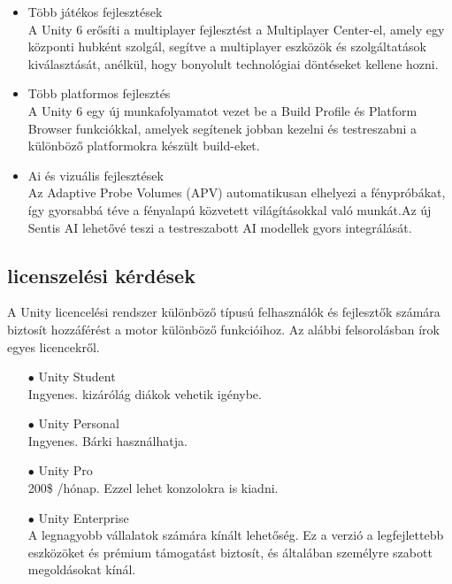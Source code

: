 \documentclass[
]{thesis-ekf}
\theoremstyle{definition}
\theoremstyle{remark}
\begin{document}
\begin{itemize}
\begin{itemize}
		\item Több játékos fejlesztések \\A  Unity 6 erősíti a multiplayer fejlesztést a Multiplayer Center-el, amely egy központi hubként szolgál, segítve a multiplayer eszközök és szolgáltatások kiválasztását, anélkül, hogy bonyolult technológiai döntéseket kellene hozni.
		\item Több platformos fejlesztés \\A Unity 6 egy új munkafolyamatot vezet be a Build Profile és Platform Browser funkciókkal, amelyek segítenek jobban kezelni és testreszabni a különböző platformokra készült build-eket.
		\item Ai és vizuális fejlesztések \\Az Adaptive Probe Volumes (APV) automatikusan elhelyezi a fénypróbákat, így gyorsabbá téve a fényalapú közvetett világításokkal való munkát.Az új Sentis AI lehetővé teszi a testreszabott AI modellek gyors integrálását.
	\end{itemize}
\end{itemize}
\subsection{licenszelési kérdések}
A Unity licencelési rendszer különböző típusú felhasználók és fejlesztők számára biztosít hozzáférést a motor különböző funkcióihoz. Az alábbi felsorolásban írok egyes licencekről.
\begin{itemize}
	\item[$\bullet$] Unity Student \\ Ingyenes. kizárólág diákok vehetik igénybe.
	\item[$\bullet$] Unity Personal\\ Ingyenes. Bárki használhatja.
	\item[$\bullet$] Unity Pro\\200\$ /hónap. Ezzel lehet konzolokra is kiadni.
	\item[$\bullet$] Unity Enterprise\\A legnagyobb vállalatok számára kínált lehetőség. Ez a verzió a legfejlettebb eszközöket és prémium támogatást biztosít, és általában személyre szabott megoldásokat kínál.
\end{itemize}
\end{document}
